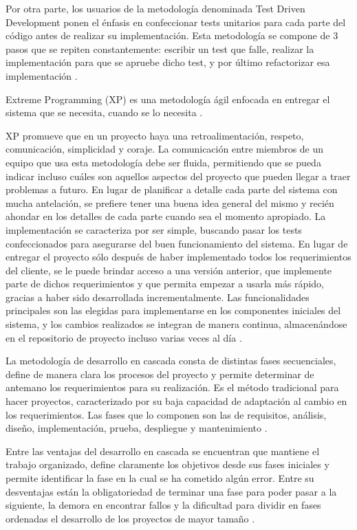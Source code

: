 \documentclass[twoside]{article}
\begin{document}
Por otra parte, los usuarios de la metodología denominada Test Driven Development ponen el énfasis en confeccionar tests unitarios para cada parte del código antes de realizar su implementación. Esta metodología se compone de 3 pasos que se repiten constantemente: escribir un test que falle, realizar la implementación para que se apruebe dicho test, y por último refactorizar esa implementación \parencite[pp. 19-20]{testingJavascript}.

Extreme Programming (XP) es una metodología ágil enfocada en entregar el sistema que se necesita, cuando se lo necesita \parencite{xp}.

XP promueve que en un proyecto haya una retroalimentación, respeto, comunicación, simplicidad y coraje. La comunicación entre miembros de un equipo que usa esta metodología debe ser fluida, permitiendo que se pueda indicar incluso cuáles son aquellos aspectos del proyecto que pueden llegar a traer problemas a futuro. En lugar de planificar a detalle cada parte del sistema con mucha antelación, se prefiere tener una buena idea general del mismo y recién ahondar en los detalles de cada parte cuando sea el momento apropiado. La implementación se caracteriza por ser simple, buscando pasar los tests confeccionados para asegurarse del buen funcionamiento del sistema. En lugar de entregar el proyecto sólo después de haber implementado todos los requerimientos del cliente, se le puede brindar acceso a una versión anterior, que implemente parte de dichos requerimientos y que permita empezar a usarla más rápido, gracias a haber sido desarrollada incrementalmente. Las funcionalidades principales son las elegidas para implementarse en los componentes iniciales del sistema, y los cambios realizados se integran de manera continua, almacenándose en el repositorio de proyecto incluso varias veces al día \parencite{agileProjectManagement}.

La metodología de desarrollo en cascada consta de distintas fases secuenciales, define de manera clara los procesos del proyecto y permite determinar de antemano los requerimientos para su realización. Es el método tradicional para hacer proyectos, caracterizado por su baja capacidad de adaptación al cambio en los requerimientos. Las fases que lo componen son las de requisitos, análisis, diseño, implementación, prueba, despliegue y mantenimiento \parencite{iepWaterfall}.

Entre las ventajas del desarrollo en cascada se encuentran que mantiene el trabajo organizado, define claramente los objetivos desde sus fases iniciales y permite identificar la fase en la cual se ha cometido algún error. Entre su desventajas están la obligatoriedad de terminar una fase para poder pasar a la siguiente, la demora en encontrar fallos y la dificultad para dividir en fases ordenadas el desarrollo de los proyectos de mayor tamaño \parencite{crehanaWaterfall}.
\end{document}
